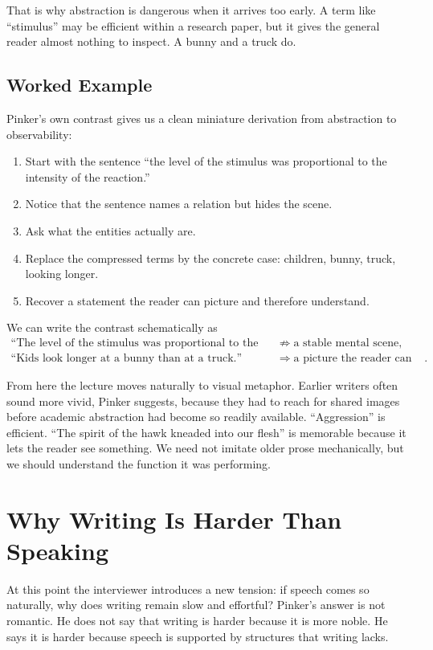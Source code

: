 That is why abstraction is dangerous when it arrives too early. A term like ``stimulus'' may be efficient within a research paper, but it gives the general reader almost nothing to inspect. A bunny and a truck do.

\subsection{Worked Example}

Pinker's own contrast gives us a clean miniature derivation from abstraction to observability:
\begin{enumerate}
\item Start with the sentence ``the level of the stimulus was proportional to the intensity of the reaction.''
\item Notice that the sentence names a relation but hides the scene.
\item Ask what the entities actually are.
\item Replace the compressed terms by the concrete case: children, bunny, truck, looking longer.
\item Recover a statement the reader can picture and therefore understand.
\end{enumerate}

We can write the contrast schematically as
\begin{align}
\text{``The level of the stimulus was proportional to the intensity of the reaction.''}
&\not\Rightarrow \text{a stable mental scene},\\
\text{``Kids look longer at a bunny than at a truck.''}
&\Rightarrow \text{a picture the reader can inspect}.
\end{align}

From here the lecture moves naturally to visual metaphor. Earlier writers often sound more vivid, Pinker suggests, because they had to reach for shared images before academic abstraction had become so readily available. ``Aggression'' is efficient. ``The spirit of the hawk kneaded into our flesh'' is memorable because it lets the reader see something. We need not imitate older prose mechanically, but we should understand the function it was performing.

\section{Why Writing Is Harder Than Speaking}

At this point the interviewer introduces a new tension: if speech comes so naturally, why does writing remain slow and effortful? Pinker's answer is not romantic. He does not say that writing is harder because it is more noble. He says it is harder because speech is supported by structures that writing lacks.


